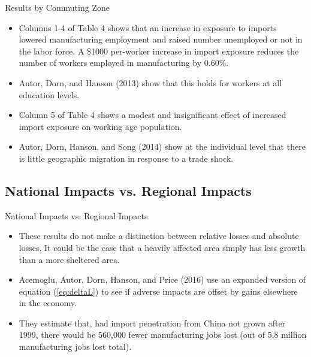 \documentclass[aspectratio=169]{beamer}
\begin{document}
\begin{frame}{Results by Commuting Zone}

\begin{itemize}
    \item<1-> Columns 1-4 of Table 4 shows that an increase in exposure to imports lowered manufacturing employment and raised number unemployed or not in the labor force.  A \$1000 per-worker increase in import exposure reduces the number of workers employed in manufacturing by 0.60\%.
    \item<2-> Autor, Dorn, and Hanson (2013) show that this holds for workers at all education levels.
    \item<3-> Column 5 of Table 4 shows a modest and insignificant effect of increased import exposure on working age population.
    \item<4-> Autor, Dorn, Hanson, and Song (2014) show at the individual level that there is little geographic migration in response to a trade shock.
\end{itemize}
    
\end{frame}


\subsection{National Impacts vs. Regional Impacts}


\begin{frame}{National Impacts vs. Regional Impacts}

\begin{itemize}
    \item<1-> These results do not make a distinction between relative losses and absolute losses.  It could be the case that a heavily affected area simply has less growth than a more sheltered area.
    \item<2-> Acemoglu, Autor, Dorn, Hanson, and Price (2016) use an expanded version of equation (\ref{eq:deltaL}) to see if adverse impacts are offset by gains elsewhere in the economy.
    \item<3-> They estimate that, had import penetration from China not grown after 1999, there would be 560,000 fewer manufacturing jobs lost (out of 5.8 million manufacturing jobs lost total).
\end{itemize}
    
\end{frame}
\end{document}

